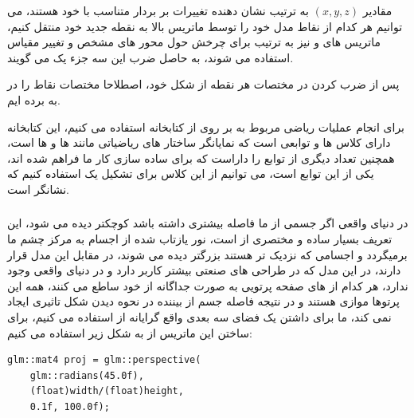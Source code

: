 \documentclass[a4paper, 12pt]{book}
\newcommand{\lrbold}[1]{\lr{\textbf{#1}}}
\newcommand{\lrit}[1]{\lr{\textit{#1}}}
\begin{document}
    مقادیر $(x, y, z)$ به ترتیب نشان دهنده تغییرات بر بردار متناسب با خود هستند، می توانیم هر کدام از نقاط مدل خود را توسط ماتریس بالا به نقطه جدید خود منتقل کنیم، ماتریس های  و  نیز به ترتیب برای چرخش حول محور های مشخص و تغییر مقیاس استفاده می شوند، به حاصل ضرب این سه جزء یک  می گویند.\par
    پس از ضرب کردن  در مختصات هر نقطه از شکل خود، اصطلاحا مختصات نقاط را در  به  برده ایم.\par
    برای انجام عملیات ریاضی مربوط به  بر روی  از کتابخانه \lrbold{GLM} استفاده می کنیم، این کتابخانه دارای کلاس ها و توابعی است که نمایانگر ساختار های ریاضیاتی مانند  ها و  ها است، همچنین تعداد دیگری از توابع را داراست که برای ساده سازی کار ما فراهم شده اند، یکی از این توابع  است، می  توانیم از این کلاس برای تشکیل یک  استفاده کنیم که نشانگر \lrbold{Camera} است.\par
    \vspace*{0.6cm}
    \subsubsection*{}
    \vspace*{0.3cm}

    در دنیای واقعی اگر جسمی از ما فاصله بیشتری داشته باشد کوچکتر دیده می شود، این تعریف بسیار ساده و مختصری از  است، نور یازتاب شده از اجسام به مرکز چشم ما برمیگردد و اجسامی که نزدیک تر هستند بزرگتر دیده می شوند، در مقابل این مدل  قرار دارند، در این مدل که در طراحی های صنعتی بیشتر کاربر دارد و در دنیای واقعی وجود ندارد، هر کدام از  های صفحه پرتویی به صورت جداگانه از خود ساطع می کنند، همه این پرتوها موازی هستند و در نتیجه فاصله جسم از بیننده در نحوه دیدن شکل تاثیری ایجاد نمی کند، ما برای داشتن یک فضای سه بعدی واقع گرایانه از  استفاده می کنیم، برای ساختن این ماتریس از  به شکل زیر استفاده می کنیم:

    \begin{LTR}
    \small
        \begin{lstlisting}[style=C++Style,caption=\lrit{fragment shader to use texture}]
glm::mat4 proj = glm::perspective(
    glm::radians(45.0f),
    (float)width/(float)height,
    0.1f, 100.0f);
        \end{lstlisting}
    \end{LTR}
    \normalsize
    \vspace*{0.3cm}
\end{document}
